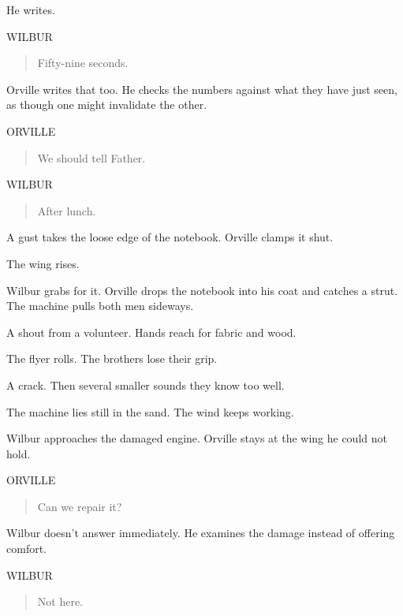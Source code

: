 \documentclass[12pt,letterpaper]{article}
\newcommand{\character}[1]{\needspace{4\baselineskip}\hspace*{2.2in}#1\par\nopagebreak}
\begin{document}
He writes.\par

\character{WILBUR}
\begin{quote}Fifty-nine seconds.\par\end{quote}

Orville writes that too. He checks the numbers against what they have just seen, as though one might invalidate the other.\par

\character{ORVILLE}
\begin{quote}We should tell Father.\par\end{quote}

\character{WILBUR}
\begin{quote}After lunch.\par\end{quote}

A gust takes the loose edge of the notebook. Orville clamps it shut.\par

The wing rises.\par

Wilbur grabs for it. Orville drops the notebook into his coat and catches a strut. The machine pulls both men sideways.\par

A shout from a volunteer. Hands reach for fabric and wood.\par

The flyer rolls. The brothers lose their grip.\par

A crack. Then several smaller sounds they know too well.\par

The machine lies still in the sand. The wind keeps working.\par

Wilbur approaches the damaged engine. Orville stays at the wing he could not hold.\par

\character{ORVILLE}
\begin{quote}Can we repair it?\par\end{quote}

Wilbur doesn't answer immediately. He examines the damage instead of offering comfort.\par

\character{WILBUR}
\begin{quote}Not here.\par\end{quote}
\end{document}
